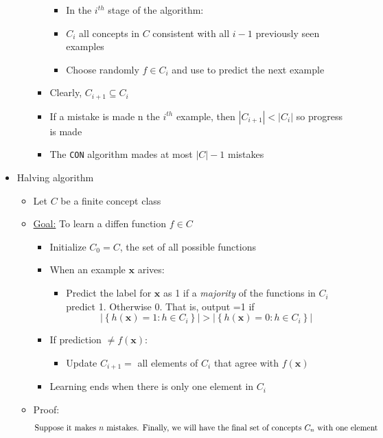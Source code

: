 \documentclass{article}
\begin{document}
\begin{itemize}
\begin{itemize}
\begin{itemize}
\begin{itemize}
                \item In the $i^{th}$ stage of the algorithm:
                \item $C_{i}$ all concepts in $C$ consistent with all $i-1$ previously seen examples
                \item Choose randomly $f\in C_{i}$ and use to predict the next example
              \end{itemize}
            \item Clearly, $C_{i+1} \subseteq C_{i}$
	\item If a mistake is made n the $i^{th}$ example, then $\left| C_{i+1}\right| < \left| C_{i}\right|$ so progress is made
	\item The \verb~CON~ algorithm mades at most $\left| C\right| -1$ mistakes
          \end{itemize}
	\end{itemize}
\item Halving algorithm
	\begin{itemize}
	\item Let $C$ be a finite concept class
	\item \underline{Goal:} To learn a diffen function $f\in C$
	\begin{itemize}
		\item Initialize $C_{0} = C$, the set of all possible functions
		\item When an example $\mathbf{x}$ arives:
			\begin{itemize}
			\item Predict the label for $\mathbf{x}$ as 1 if a {\em majority} of the functions in $C_{i}$ predict 1. Otherwise 0. That is, output =1 if
			\[
				\left| \left\{ h(\mathbf{x}) = 1 : h\in C_{i} \right\} \right| > \left| \left\{ h(\mathbf{x}) = 0 : h\in C_{i} \right\}  \right|
			\]
			\end{itemize}
		\item If prediction $\neq f(\mathbf{x})$:
			\begin{itemize}
				\item Update $C_{i+1} = $ all elements of $C_{i}$ that agree with $f(\mathbf{x})$
			\end{itemize}
		\item Learning ends when there is only one element in $C_{i}$
	\end{itemize}
	\item Proof:
		\begin{align*}
		\intertext{Suppose it makes $n$ mistakes. Finally, we will have the final set of concepts $C_{n}$ with one element}

\end{align*}
\end{itemize}
\end{itemize}
\end{document}
